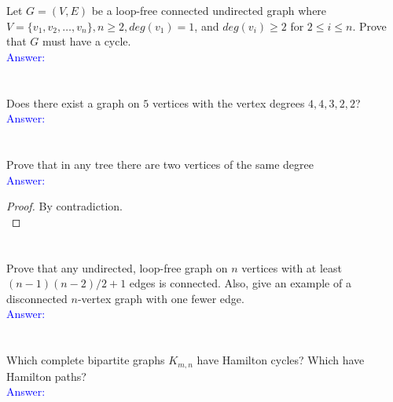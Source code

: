 \documentclass[a4paper]{article}
\begin{document}
\section{}
Let $G=(V,E)$ be a loop-free connected undirected graph where $V=\{v_1,v_2,\ldots, v_n\}, n\geq2,deg(v_1)=1$, and $deg(v_i)\geq 2$ for $2\leq i\leq n$. Prove that $G$ must have a cycle.\\
\textcolor{blue}{Answer:}

\section{}
Does there exist a graph on $5$ vertices with the vertex degrees $4,4,3,2,2$?\\
\textcolor{blue}{Answer:} 

\section{}
Prove that in any tree there are two vertices of the same degree \\
\textcolor{blue}{Answer:} 
\begin{proof} By contradiction.\\
\end{proof}

\section{}
Prove that any undirected, loop-free graph on $n$ vertices with at least $(n-1)(n-2)/2 + 1$ edges is connected. Also, give
an example of a disconnected $n$-vertex graph with one fewer edge.\\
\textcolor{blue}{Answer:} 


\section{}
Which complete bipartite graphs $K_{m,n}$ have Hamilton cycles? Which have Hamilton paths?\\

\textcolor{blue}{Answer:} 
\end{document}
